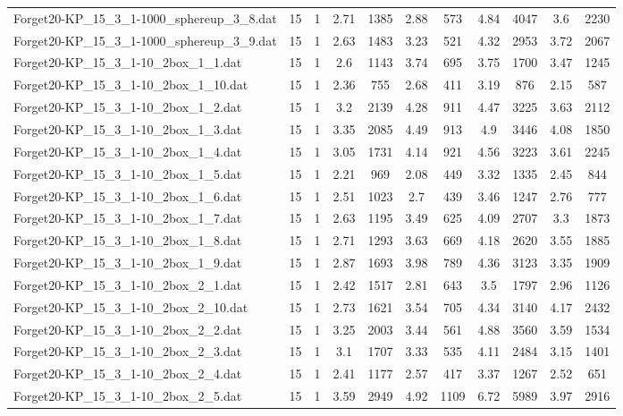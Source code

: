 \begin{table}[!ht]
\begin{tabular}{lcccccccccc}
Forget20-KP\_15\_3\_1-1000\_sphereup\_3\_8.dat & 15 & 1 & 2.71 & 1385 & 2.88 & 573 & 4.84 & 4047 & 3.6 & 2230 \\
Forget20-KP\_15\_3\_1-1000\_sphereup\_3\_9.dat & 15 & 1 & 2.63 & 1483 & 3.23 & 521 & 4.32 & 2953 & 3.72 & 2067 \\
Forget20-KP\_15\_3\_1-10\_2box\_1\_1.dat & 15 & 1 & 2.6 & 1143 & 3.74 & 695 & 3.75 & 1700 & 3.47 & 1245 \\
Forget20-KP\_15\_3\_1-10\_2box\_1\_10.dat & 15 & 1 & 2.36 & 755 & 2.68 & 411 & 3.19 & 876 & 2.15 & 587 \\
Forget20-KP\_15\_3\_1-10\_2box\_1\_2.dat & 15 & 1 & 3.2 & 2139 & 4.28 & 911 & 4.47 & 3225 & 3.63 & 2112 \\
Forget20-KP\_15\_3\_1-10\_2box\_1\_3.dat & 15 & 1 & 3.35 & 2085 & 4.49 & 913 & 4.9 & 3446 & 4.08 & 1850 \\
Forget20-KP\_15\_3\_1-10\_2box\_1\_4.dat & 15 & 1 & 3.05 & 1731 & 4.14 & 921 & 4.56 & 3223 & 3.61 & 2245 \\
Forget20-KP\_15\_3\_1-10\_2box\_1\_5.dat & 15 & 1 & 2.21 & 969 & 2.08 & 449 & 3.32 & 1335 & 2.45 & 844 \\
Forget20-KP\_15\_3\_1-10\_2box\_1\_6.dat & 15 & 1 & 2.51 & 1023 & 2.7 & 439 & 3.46 & 1247 & 2.76 & 777 \\
Forget20-KP\_15\_3\_1-10\_2box\_1\_7.dat & 15 & 1 & 2.63 & 1195 & 3.49 & 625 & 4.09 & 2707 & 3.3 & 1873 \\
Forget20-KP\_15\_3\_1-10\_2box\_1\_8.dat & 15 & 1 & 2.71 & 1293 & 3.63 & 669 & 4.18 & 2620 & 3.55 & 1885 \\
Forget20-KP\_15\_3\_1-10\_2box\_1\_9.dat & 15 & 1 & 2.87 & 1693 & 3.98 & 789 & 4.36 & 3123 & 3.35 & 1909 \\
Forget20-KP\_15\_3\_1-10\_2box\_2\_1.dat & 15 & 1 & 2.42 & 1517 & 2.81 & 643 & 3.5 & 1797 & 2.96 & 1126 \\
Forget20-KP\_15\_3\_1-10\_2box\_2\_10.dat & 15 & 1 & 2.73 & 1621 & 3.54 & 705 & 4.34 & 3140 & 4.17 & 2432 \\
Forget20-KP\_15\_3\_1-10\_2box\_2\_2.dat & 15 & 1 & 3.25 & 2003 & 3.44 & 561 & 4.88 & 3560 & 3.59 & 1534 \\
Forget20-KP\_15\_3\_1-10\_2box\_2\_3.dat & 15 & 1 & 3.1 & 1707 & 3.33 & 535 & 4.11 & 2484 & 3.15 & 1401 \\
Forget20-KP\_15\_3\_1-10\_2box\_2\_4.dat & 15 & 1 & 2.41 & 1177 & 2.57 & 417 & 3.37 & 1267 & 2.52 & 651 \\
Forget20-KP\_15\_3\_1-10\_2box\_2\_5.dat & 15 & 1 & 3.59 & 2949 & 4.92 & 1109 & 6.72 & 5989 & 3.97 & 2916 \\

\end{tabular}
\end{table}
